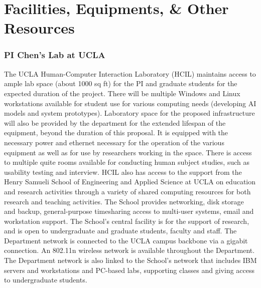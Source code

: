 \section*{Facilities, Equipments, \& Other Resources}

\subsubsection*{PI Chen's Lab at UCLA}
The UCLA Human-Computer Interaction Laboratory (HCIL) maintains access to ample lab space (about 1000 sq ft) for the PI and graduate students for the expected duration of the project.  There will be multiple Windows and Linux workstations available for student use for various computing needs (\eg developing AI models and system prototypes).  Laboratory space for the proposed infrastructure will also be provided by the department for the extended lifespan of the equipment, beyond the duration of this proposal.  It is equipped with the necessary power and ethernet necessary for the operation of the various equipment as well as for use by researchers working in the space. There is access to multiple quite rooms available for conducting human subject studies, such as usability testing and interview.
HCIL also has access to the support from the Henry Samueli School of Engineering and Applied Science at UCLA on education and research activities through a variety of shared computing resources for both research and teaching activities. The School provides networking, disk storage and backup, general-purpose timesharing access to multi-user systems, email and workstation support. The School's central facility is for the support of research, and is open to undergraduate and graduate students, faculty and staff. The Department network is connected to the UCLA campus backbone via a gigabit connection. An 802.11n wireless network is available throughout the Department. The Department network is also linked to the School's network that includes IBM servers and workstations and PC-based labs, supporting classes and giving access to undergraduate students. 